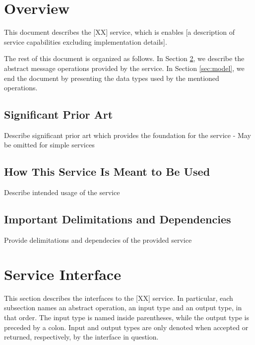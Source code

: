 \documentclass[a4paper]{arrowhead}
\begin{document}
\section{Overview}
\label{sec:overview}
\color{red}
This document describes the [XX] service, which is enables [a description of service capabilities excluding implementation details]. 

The rest of this document is organized as follows.
In Section \ref{sec:operations}, we describe the abstract message operations provided by the service.
In Section \ref{sec:model}, we end the document by presenting the data types used by the mentioned operations.
\color{black}

\newpage

\subsection{Significant Prior Art}

\color{red} Describe significant prior art which provides the
foundation for the service - May be omitted for simple services \color{black}  

\subsection{How This Service Is Meant to Be Used}
\color{red} Describe intended usage of the service \color{black}  


\subsection{Important Delimitations and Dependencies}
\label{sec:delimitations}

\color{red} Provide delimitations and dependecies of the provided service \color{black}  



\newpage

\section{Service Interface}
\label{sec:operations}

\color{red}
This section describes the interfaces to the [XX] service.
In particular, each subsection names an abstract operation, an input type and an output type, in that order.
The input type is named inside parentheses, while the output type is preceded by a colon.
Input and output types are only denoted when accepted or returned, respectively, by the interface in question.
\end{document}
